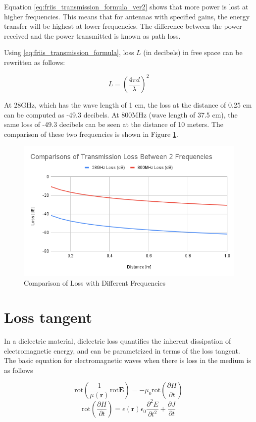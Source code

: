 \documentclass[a4paper,12pt]{report}
\begin{document}
Equation \ref{eq:friis_transmission_formula_ver2}
shows that more power is lost at higher frequencies.
This means that for antennas with specified gains,
the energy transfer will be highest at lower frequencies.
The difference between the power received and
the power transmitted is known as path loss.

Using \ref{eq:friis_transmission_formula},
loss $L$ (in decibels) in free space can be rewritten as follows:

\begin{equation}
  L = \left(\frac{4\pi d}{\lambda} \right)^2
\end{equation}

At 28GHz, which has the wave length of 1 cm,
the loss at the distance of 0.25 cm can be computed as -49.3 decibels.
At 800MHz (wave length of 37.5 cm), the same loss of -49.3 decibels can be seen at
the distance of 10 meters.
The comparison of these two frequencies is shown in Figure \ref{fig:loss_comparison}.

\begin{figure}
  \begin{center}
    \includegraphics[clip, keepaspectratio, width=0.7\linewidth]{img/loss_comparison.png}
    \caption{Comparison of Loss with Different Frequencies}
    \label{fig:loss_comparison}
  \end{center}
\end{figure}

\section{Loss tangent}

In a dielectric material, dielectric loss quantifies the inherent dissipation
of electromagnetic energy, and can be parametrized in terms of the loss tangent.
The basic equation for electromagnetic waves
when there is loss in the medium is as follows

\begin{equation}
  \mathrm{rot}(\frac{1}{\mu(\boldsymbol{r})}\mathrm{rot}\boldsymbol{E}) = -\mu_0 \mathrm{rot}(\frac{\partial H}{\partial t})
\end{equation}
\begin{equation}
  \mathrm{rot}(\frac{\partial H}{\partial t}) = \epsilon(\boldsymbol{r})\epsilon_0 \frac{\partial^2 E}{\partial t^2} + \frac{\partial J}{\partial t}
\end{equation}
\end{document}
